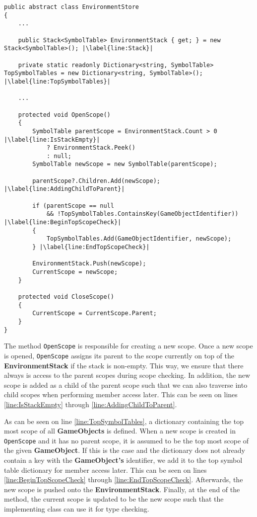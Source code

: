 \begin{lstlisting}[language=CSharp, caption={Abstract class SemanticAnalysis}, label={lst:ACSemanticAnalysis},escapechar=|]
public abstract class EnvironmentStore
{
    ...

    public Stack<SymbolTable> EnvironmentStack { get; } = new Stack<SymbolTable>(); |\label{line:Stack}|

    private static readonly Dictionary<string, SymbolTable> TopSymbolTables = new Dictionary<string, SymbolTable>(); |\label{line:TopSymbolTables}|

    ...

    protected void OpenScope()
    {
        SymbolTable parentScope = EnvironmentStack.Count > 0 |\label{line:IsStackEmpty}|
            ? EnvironmentStack.Peek() 
            : null;
        SymbolTable newScope = new SymbolTable(parentScope); 
        
        parentScope?.Children.Add(newScope); |\label{line:AddingChildToParent}|
        
        if (parentScope == null 
            && !TopSymbolTables.ContainsKey(GameObjectIdentifier)) |\label{line:BeginTopScopeCheck}|
        {
            TopSymbolTables.Add(GameObjectIdentifier, newScope);
        } |\label{line:EndTopScopeCheck}|

        EnvironmentStack.Push(newScope);
        CurrentScope = newScope;
    }

    protected void CloseScope()
    {
        CurrentScope = CurrentScope.Parent;
    }
}
\end{lstlisting}

The method \texttt{OpenScope} is responsible for creating a new scope. Once a new scope is opened, \texttt{OpenScope} assigns its parent to the scope currently on top of the \textbf{EnvironmentStack} if the stack is non-empty. This way, we ensure that there always is access to the parent scopes during scope checking. 
In addition, the new scope is added as a child of the parent scope such that we can also traverse into child scopes when performing member access later. This can be seen on lines \ref{line:IsStackEmpty} through \ref{line:AddingChildToParent}.


As can be seen on line \ref{line:TopSymbolTables}, a dictionary containing the top most scope of all \textbf{GameObjects} is defined. When a new scope is created in \texttt{OpenScope} and it has no parent scope, it is assumed to be the top most scope of the given \textbf{GameObject}.
If this is the case and the dictionary does not already contain a key with the \textbf{GameObject's} identifier, we add it to the top symbol table dictionary for member access later. This can be seen on lines \ref{line:BeginTopScopeCheck} through \ref{line:EndTopScopeCheck}.
Afterwards, the new scope is pushed onto the \textbf{EnvironmentStack}. 
Finally, at the end of the method, the current scope is updated to be the new scope such that the implementing class can use it for type checking. 

